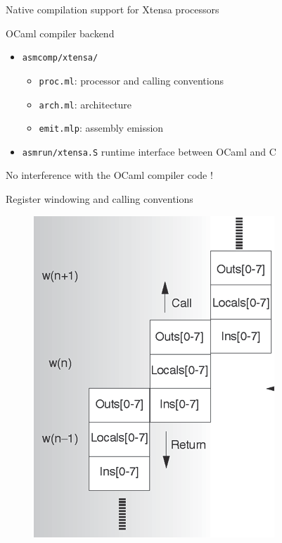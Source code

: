 \documentclass[10pt]{beamer}
\begin{document}
\begin{frame}{Native compilation support for Xtensa processors}

OCaml compiler backend

\begin{itemize}
\item \texttt{asmcomp/xtensa/} \begin{itemize}
  \item \texttt{proc.ml}: processor and calling conventions
  \item \texttt{arch.ml}: architecture
  \item \texttt{emit.mlp}: assembly emission
  \end{itemize}
\item \texttt{asmrun/xtensa.S} runtime interface between OCaml and C
\end{itemize}

No interference with the OCaml compiler code !
\end{frame}

\begin{frame}{Register windowing and calling conventions}
\begin{figure}
\centering
\includegraphics[height=0.9\textheight]{window.png}
\end{figure}
\end{frame}
\end{document}
